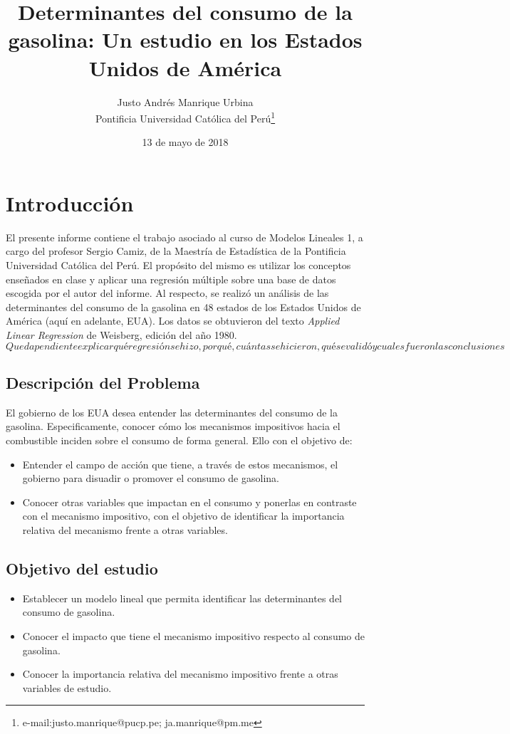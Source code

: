\documentclass[a4paper,10pt]{article}
\title{Determinantes del consumo de la gasolina: Un estudio en los Estados Unidos de América}
\author{Justo Andrés Manrique Urbina\\Pontificia Universidad Católica del Perú\thanks{e-mail:justo.manrique@pucp.pe; ja.manrique@pm.me}}
\date{13 de mayo de 2018}
\begin{document}
\maketitle
\section{Introducción}
	El presente informe contiene el trabajo asociado al curso de Modelos Lineales 1, a cargo del profesor Sergio Camiz, de la Maestría de Estadística de la Pontificia Universidad Católica del Perú. El propósito del mismo es utilizar los conceptos enseñados en clase y aplicar una regresión múltiple sobre una base de datos escogida por el autor del informe. Al respecto, se realizó un análisis de las determinantes del consumo de la gasolina en 48 estados de los Estados Unidos de América (aquí en adelante, EUA). Los datos se obtuvieron del texto \textit{Applied Linear Regression} de Weisberg, edición del año 1980.
	$Queda pendiente explicar qué regresión se hizo, por qué, cuántas se hicieron, qué se validó y cuales fueron las conclusiones$
	\subsection{Descripción del Problema}
		El gobierno de los EUA desea entender las determinantes del consumo de la gasolina. Especificamente, conocer cómo los mecanismos impositivos hacia el combustible inciden sobre el consumo de forma general. Ello con el objetivo de:
		\begin{itemize}
			\item Entender el campo de acción que tiene, a través de estos mecanismos, el gobierno para disuadir o promover el consumo de gasolina.
			\item Conocer otras variables que impactan en el consumo y ponerlas en contraste con el mecanismo impositivo, con el objetivo de identificar la importancia relativa del mecanismo frente a otras variables.
		\end{itemize}
	\subsection{Objetivo del estudio}
		 \begin{itemize}
		 	\item Establecer un modelo lineal que permita identificar las determinantes del consumo de gasolina.
		 	\item Conocer el impacto que tiene el mecanismo impositivo respecto al consumo de gasolina.
		 	\item Conocer la importancia relativa del mecanismo impositivo frente a otras variables de estudio.
		 \end{itemize}
\end{document}
